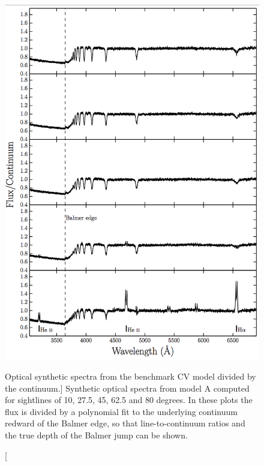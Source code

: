 \begin{figure}
\centering 
\includegraphics[width=1.0\textwidth]{figures/05-cvpaper/modela_opt_cont.png}
\caption
[Optical synthetic spectra from the benchmark CV model divided by the continuum.]
{Synthetic optical spectra from model A computed for 
sightlines of 10, 27.5, 45, 62.5 and 80 degrees. In these plots
the flux is divided by a polynomial fit to the 
underlying continuum redward of the Balmer edge, so that 
line-to-continuum ratios and the true depth of the
Balmer jump can be shown.}
\label{spec_continuum}
\end{figure} 

